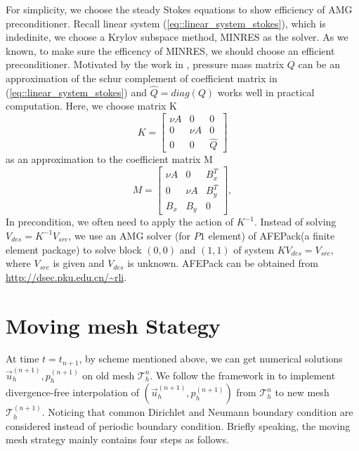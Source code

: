 \documentclass[a4paper, 11pt]{article}
\begin{document}
   For simplicity, we choose the steady Stokes equations to show
   efficiency of AMG preconditioner. Recall linear system
   (\ref{eq::linear_system_stokes}), which is indedinite, we choose a
   Krylov subspace method, MINRES as the solver. As we known, to make 
   sure the efficency of MINRES, we should choose an efficient
   preconditioner. Motivated by the work in \cite{elman2005finite},
   pressure mass matrix $Q$ can be an approximation of the schur
   complement of coefficient matrix in
   (\ref{eq::linear_system_stokes}) and $\hat{Q} = diag(Q)$ works well
   in practical computation.  Here, we choose matrix K
   \begin{equation}
     K = \left[
           \begin{array}{lll}
             \nu A & 0 & 0 \\
             0 & \nu A  & 0 \\
             0 & 0 & \hat{Q}
           \end{array}
         \right]     
   \end{equation}
   as an approximation to the coefficient matrix M 
   \begin{equation}
     M = \left[
           \begin{array}{lll}
             \nu A & 0 & B_x^T \\
             0 & \nu A  & B_y^T \\
             B_x & B_y & 0
           \end{array}
         \right],     
   \end{equation}
   In precondition, we often need to apply the action of $K^{-1}$.
   Instead of solving $V_{des} = K^{-1} V_{src}$, we use an AMG
   solver (for $P1$ element) of AFEPack(a finite element package) to
   solve block $(0, 0)$ and $(1, 1)$ of system $K V_{des} = V_{src}$, 
   where $V_{src}$ is given and $V_{des}$ is unknown. AFEPack can be
   obtained from \url{http://dsec.pku.edu.cn/~rli}.
   
\section{Moving mesh  Stategy}
   At time $t = t_{n + 1}$, by scheme mentioned above, we can get
   numerical solutions $\vec{u}_h^{(n + 1)}, p_h^{(n + 1)}$ on old
   mesh $\mathcal{T}_h^n$. We follow the framework in
   \cite{di2005moving} to implement divergence-free
   interpolation of $(\vec{u}_h^{(n + 1)}, p_h^{(n + 1)})$ from
   $\mathcal{T}_h^n$ to new mesh $\mathcal{T}_h^{(n + 1)}$.
   Noticing that common Dirichlet and Neumann boundary
   condition are considered instead of periodic boundary condition.
   Briefly speaking, the moving mesh strategy mainly contains four
   steps as follows.
\end{document}
